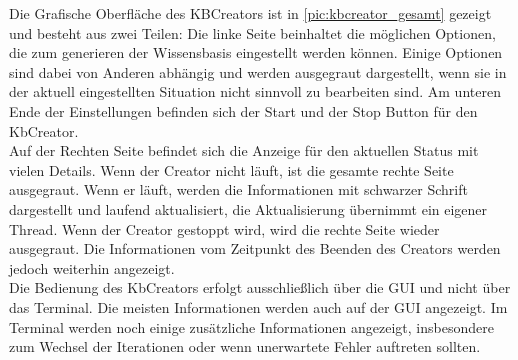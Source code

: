 \documentclass[12pt,a4paper]{article}
\begin{document}
Die Grafische Oberfläche des KBCreators ist in \autoref{pic:kbcreator_gesamt} gezeigt und besteht aus zwei Teilen: Die linke Seite beinhaltet die möglichen Optionen, die zum generieren der Wissensbasis eingestellt werden können. Einige Optionen sind dabei von Anderen abhängig und werden ausgegraut dargestellt, wenn sie in der aktuell eingestellten Situation nicht sinnvoll zu bearbeiten sind. Am unteren Ende der Einstellungen befinden sich der Start und der Stop Button für den KbCreator.\\
Auf der Rechten Seite befindet sich die Anzeige für den aktuellen Status mit vielen Details. Wenn der Creator nicht läuft, ist die gesamte rechte Seite ausgegraut. Wenn er läuft, werden die Informationen mit schwarzer Schrift dargestellt und laufend aktualisiert, die Aktualisierung übernimmt ein eigener Thread. Wenn der Creator gestoppt wird, wird die rechte Seite wieder ausgegraut. Die Informationen vom Zeitpunkt des Beenden des Creators werden jedoch weiterhin angezeigt. \\
Die Bedienung des KbCreators erfolgt ausschließlich über die GUI und nicht über das Terminal. Die meisten Informationen werden auch auf der GUI angezeigt. Im Terminal werden noch einige zusätzliche Informationen angezeigt, insbesondere zum Wechsel der Iterationen oder wenn unerwartete Fehler auftreten sollten.
\end{document}
